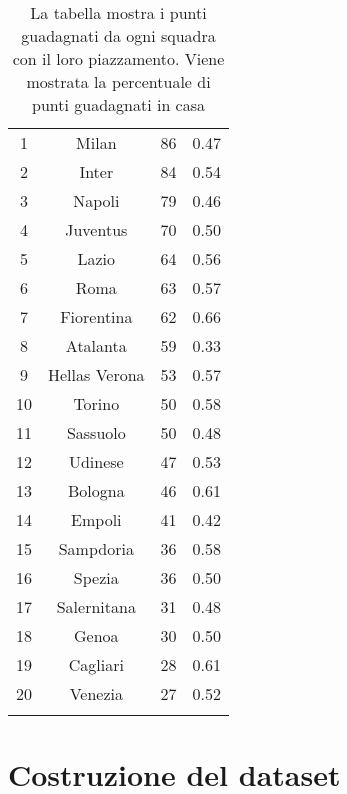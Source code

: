 	\begin{table}[h]%
	\renewcommand{\arraystretch}{1.7}
	\centering
	\begin{tabular}{c c c c}
		\hline	
		\rowcolor{SchoolColor}
		\intest{Posizione} & \intest{Squadra} & \intest{Punti} & \intest{ \% casa}  \\	
		\hline			
		1 & Milan & 86 & 0.47\\
		2 & Inter & 84 & 0.54\\
		3 & Napoli & 79 & 0.46\\
		4 & Juventus & 70 & 0.50\\
		5 & Lazio & 64 & 0.56\\
		6 & Roma & 63 & 0.57\\
		7 & Fiorentina & 62 & 0.66\\
		8 & Atalanta & 59 & 0.33\\
		9 & Hellas Verona & 53 & 0.57\\
		10 & Torino & 50 & 0.58\\
		11 & Sassuolo & 50 & 0.48\\
		12 & Udinese & 47 & 0.53\\
		13 & Bologna & 46 & 0.61\\
		14 & Empoli & 41 & 0.42\\
		15 & Sampdoria & 36 & 0.58\\
		16 & Spezia & 36 & 0.50\\
		17 & Salernitana & 31 & 0.48\\
		18 & Genoa & 30 & 0.50\\
		19 & Cagliari & 28 & 0.61\\
		20 & Venezia & 27 & 0.52\\
			\hline
		 & & & \\
	
	\end{tabular} \hbox{}

	\caption{La tabella mostra i punti guadagnati da ogni squadra con il loro piazzamento. Viene mostrata la percentuale di punti guadagnati in casa} \label{tab:ranking}
\end{table}




\section{Costruzione del dataset}

